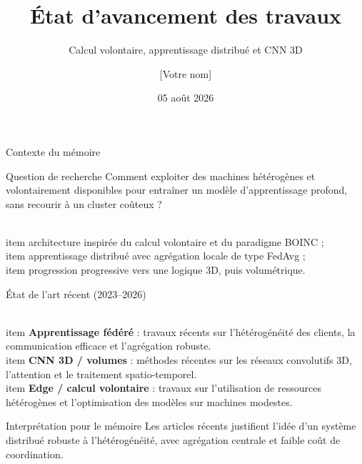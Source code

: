 \documentclass[11pt]{beamer}
\title{État d'avancement des travaux}
\subtitle{Calcul volontaire, apprentissage distribué et CNN 3D}
\author{[Votre nom]}
\date{05 août 2026}
\begin{document}
\begin{frame}
  \titlepage
\end{frame}

\begin{frame}{Contexte du mémoire}
  \begin{block}{Question de recherche}
    Comment exploiter des machines hétérogènes et volontairement disponibles pour entraîner un modèle d'apprentissage profond, sans recourir à un cluster coûteux ?
  \end{block}
  \vspace{0.4cm}
  \begin{itemize}
    \\item architecture inspirée du calcul volontaire et du paradigme BOINC ;
    \\item apprentissage distribué avec agrégation locale de type FedAvg ;
    \\item progression progressive vers une logique 3D, puis volumétrique.
  \end{itemize}
\end{frame}

\begin{frame}{État de l'art récent (2023--2026)}
  \begin{itemize}
    \\item \textbf{Apprentissage fédéré} : travaux récents sur l'hétérogénéité des clients, la communication efficace et l'agrégation robuste.
    \\item \textbf{CNN 3D / volumes} : méthodes récentes sur les réseaux convolutifs 3D, l'attention et le traitement spatio-temporel.
    \\item \textbf{Edge / calcul volontaire} : travaux sur l'utilisation de ressources hétérogènes et l'optimisation des modèles sur machines modestes.
  \end{itemize}
  \vspace{0.4cm}
  \begin{alertblock}{Interprétation pour le mémoire}
    Les articles récents justifient l'idée d'un système distribué robuste à l'hétérogénéité, avec agrégation centrale et faible coût de coordination.
  \end{alertblock}
\end{frame}
\end{document}
